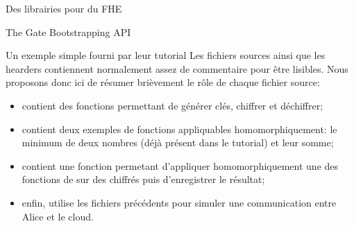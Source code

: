 \begin{section}{Des librairies pour du FHE}
\begin{subsection}{The Gate Bootstrapping API}
\begin{subsubsection}{Un exemple simple fourni par leur tutorial}
Les fichiers sources ainsi que les hearders contiennent normalement assez de
commentaire pour être lisibles. Nous proposons donc ici de résumer brièvement 
le rôle de chaque fichier source:
\begin{itemize}
\item {} contient des fonctions permettant de générer
clés, chiffrer et déchiffrer;
\item {} contient deux exemples de fonctions 
appliquables homomorphiquement: le minimum de deux nombres (déjà 
présent dans le tutorial) et leur somme;
\item {} contient une fonction permetant d'appliquer 
homomorphiquement une des fonctions de 
sur des chiffrés puis d'enregistrer le résultat;
\item enfin,  utilise les fichiers précédents
	pour simuler une communication entre Alice et le cloud.
\end{itemize}


	
\end{subsubsection} %
\end{subsection} %
\end{section}
